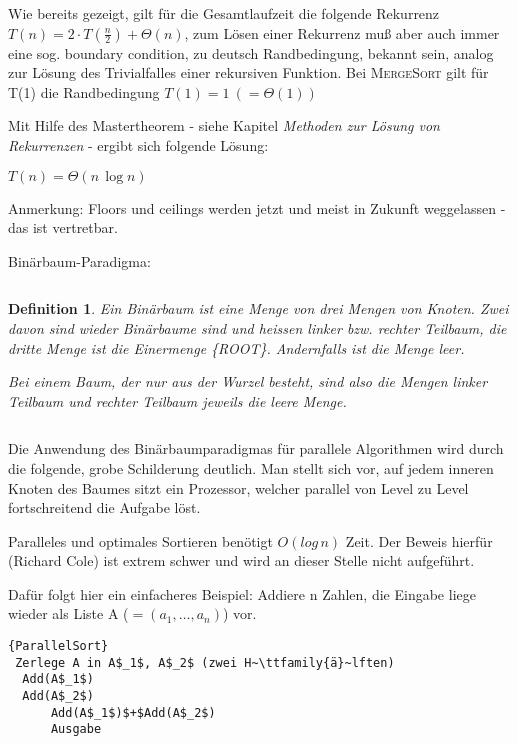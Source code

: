 \documentclass{scrreprt}%
\theoremstyle{break}
\newtheorem{definition}{Definition}
\begin{document}
Wie bereits gezeigt, gilt für die Gesamtlaufzeit die folgende Rekurrenz $T(n) = 2\cdot T(\frac{n}{2})+\Theta(n)$, zum Lösen einer
Rekurrenz muß aber auch immer eine sog. boundary condition, zu deutsch Randbedingung, bekannt sein, analog zur Lösung des Trivialfalles einer rekursiven
Funktion. Bei \textsc{MergeSort} gilt für T(1) die Randbedingung $T(1) = 1\ (=\Theta(1))$

Mit Hilfe des Mastertheorem - siehe Kapitel \textit{Methoden zur Lösung von Rekurrenzen} - ergibt sich folgende Lösung:

$T(n) = \Theta(n\, \log n)$ 

Anmerkung: Floors und ceilings werden jetzt und meist in Zukunft weggelassen - das ist vertretbar.

\begin{description}
	\item [Binärbaum-Paradigma:] 
\end{description}
	
$$  $$

\begin{definition}
	  Ein Binärbaum ist eine Menge von drei Mengen von Knoten. Zwei davon sind wieder Binärbaume sind und heissen linker bzw.
	  rechter Teilbaum, die dritte Menge ist die Einermenge \{ROOT\}. Andernfalls ist die Menge leer.
	  
	  Bei einem Baum, der nur aus der Wurzel besteht, sind also die Mengen linker Teilbaum und rechter Teilbaum jeweils die leere
	  Menge.
\end{definition}

$$  $$

Die Anwendung des Binärbaumparadigmas für parallele Algorithmen wird durch die folgende, grobe Schilderung deutlich.
Man stellt sich vor, auf jedem inneren Knoten des Baumes sitzt ein Prozessor, welcher parallel von Level zu Level fortschreitend die
Aufgabe löst.

Paralleles und optimales Sortieren benötigt $O(log\,n)$ Zeit. Der Beweis hierfür (Richard Cole) ist extrem schwer und wird an dieser Stelle nicht aufgeführt.

Dafür folgt hier ein einfacheres Beispiel: Addiere n Zahlen, die Eingabe liege wieder als Liste A ($=(a_1,\ldots,a_n)$) vor.

\begin{Algorithmus}[h]
\begin{lstlisting}[frame=tlrb, mathescape=true, title=\textsc{ParallelSort}, gobble=1]{ParallelSort}
 Zerlege A in A$_1$, A$_2$ (zwei H~\ttfamily{ä}~lften)
  Add(A$_1$)
  Add(A$_2$)
      Add(A$_1$)$+$Add(A$_2$)
      Ausgabe
      \end{lstlisting}
  \end{Algorithmus}
\end{document}
